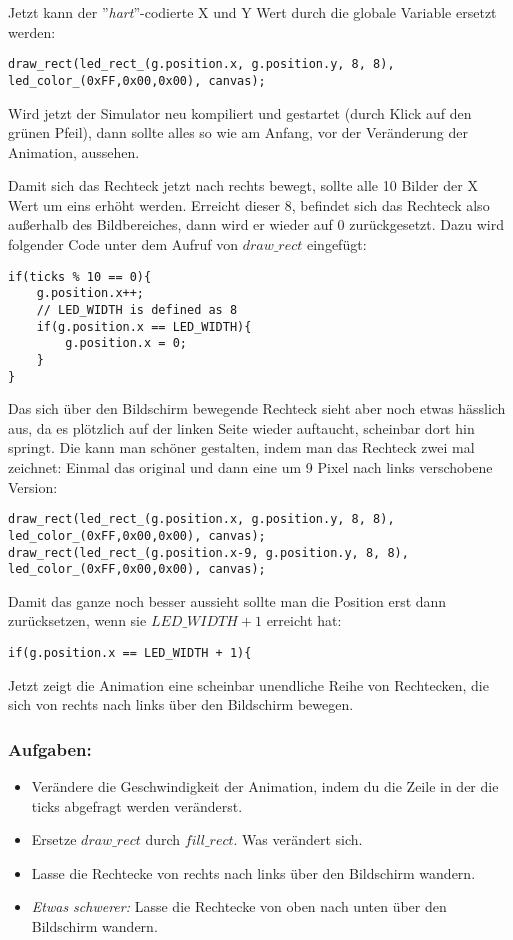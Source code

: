 \documentclass[10pt,a4paper]{article}
\begin{document}
Jetzt kann der ''\textit{hart}''-codierte X und Y Wert durch die globale Variable ersetzt werden:
\begin{lstlisting}
draw_rect(led_rect_(g.position.x, g.position.y, 8, 8), led_color_(0xFF,0x00,0x00), canvas);
\end{lstlisting}

Wird jetzt der Simulator neu kompiliert und gestartet (durch Klick auf den grünen Pfeil), dann sollte alles so wie am Anfang, vor der Veränderung der Animation, aussehen.

Damit sich das Rechteck jetzt nach rechts bewegt, sollte alle 10 Bilder der X Wert um eins erhöht werden. Erreicht dieser 8, befindet sich das Rechteck also außerhalb des Bildbereiches, dann wird er wieder auf 0 zurückgesetzt. Dazu wird folgender Code unter dem Aufruf von \textit{$draw\_rect$} eingefügt:
\begin{lstlisting}
if(ticks % 10 == 0){
    g.position.x++;
    // LED_WIDTH is defined as 8
    if(g.position.x == LED_WIDTH){
        g.position.x = 0;
    }
}
\end{lstlisting}

Das sich über den Bildschirm bewegende Rechteck sieht aber noch etwas hässlich aus, da es plötzlich auf der linken Seite wieder auftaucht, scheinbar dort hin springt.
Die kann man schöner gestalten, indem man das Rechteck zwei mal zeichnet: Einmal das original und dann eine um 9 Pixel nach links verschobene Version:
\begin{lstlisting}
draw_rect(led_rect_(g.position.x, g.position.y, 8, 8), led_color_(0xFF,0x00,0x00), canvas);
draw_rect(led_rect_(g.position.x-9, g.position.y, 8, 8), led_color_(0xFF,0x00,0x00), canvas);
\end{lstlisting}

Damit das ganze noch besser aussieht sollte man die Position erst dann zurücksetzen, wenn sie \textit{$LED\_WIDTH + 1$} erreicht hat:
\begin{lstlisting}
if(g.position.x == LED_WIDTH + 1){
\end{lstlisting}

Jetzt zeigt die Animation eine scheinbar unendliche Reihe von Rechtecken, die sich von rechts nach links über den Bildschirm bewegen.

\subsubsection{Aufgaben:}
\begin{itemize}
\item Verändere die Geschwindigkeit der Animation, indem du die Zeile in der die ticks abgefragt werden veränderst.
\item Ersetze \textit{$draw\_rect$} durch \textit{$fill\_rect$}. Was verändert sich.
\item Lasse die Rechtecke von rechts nach links über den Bildschirm wandern.
\item \textit{Etwas schwerer:} Lasse die Rechtecke von oben nach unten über den Bildschirm wandern.
\end{itemize}
\end{document}
